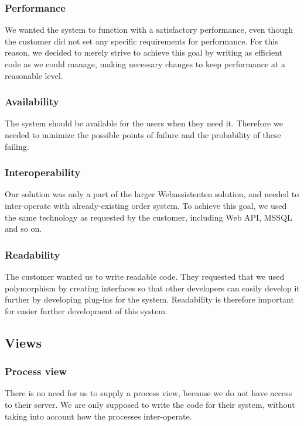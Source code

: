 \subsubsection{Performance}
We wanted the system to function with a satisfactory performance, even though the customer did not set any specific requirements for performance. For this reason, we decided to merely strive to achieve this goal by writing as efficient code as we could manage, making necessary changes to keep performance at a reasonable level. %

\subsubsection{Availability}
The system should be available for the users when they need it. Therefore we needed to minimize the possible points of failure and the probability of these failing. %

\subsubsection{Interoperability}
Our solution was only a part of the larger Webassistenten solution, and needed to inter-operate with already-existing order system. To achieve this goal, we used the same technology as requested by the customer, including Web API, MSSQL and so on.

\subsubsection{Readability}
The customer wanted us to write readable code. They requested that we used polymorphism by creating interfaces so that other developers can easily develop it further by developing plug-ins for the system. Readability is therefore important for easier further development of this system.


\subsection{Views}

\subsubsection{Process view}
There is no need for us to supply a process view, because we do not have access to their server. We are only supposed to write the code for their system, without taking into account how the processes inter-operate.
